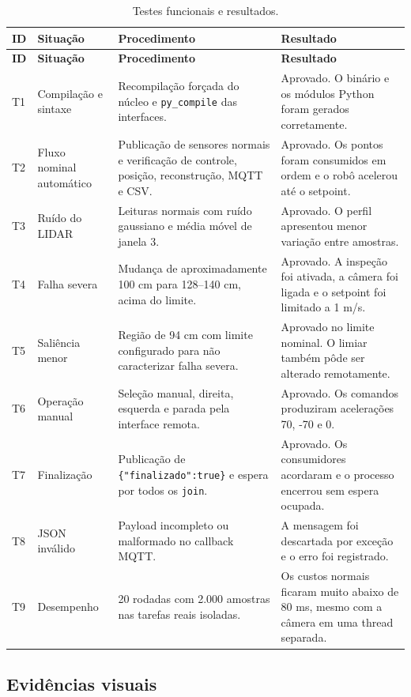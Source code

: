 \documentclass[12pt,a4paper]{article}
\begin{document}
\begin{longtable}{p{0.8cm}p{4.2cm}p{5.0cm}p{4.0cm}}
\caption{Testes funcionais e resultados.}
\label{tab:testes}\\
\toprule
\textbf{ID} & \textbf{Situação} & \textbf{Procedimento} & \textbf{Resultado} \\
\midrule
\endfirsthead
\toprule
\textbf{ID} & \textbf{Situação} & \textbf{Procedimento} & \textbf{Resultado} \\
\midrule
\endhead
T1 & Compilação e sintaxe & Recompilação forçada do núcleo e \texttt{py\_compile} das interfaces. & Aprovado. O binário e os módulos Python foram gerados corretamente. \\
T2 & Fluxo nominal automático & Publicação de sensores normais e verificação de controle, posição, reconstrução, MQTT e CSV. & Aprovado. Os pontos foram consumidos em ordem e o robô acelerou até o setpoint. \\
T3 & Ruído do LIDAR & Leituras normais com ruído gaussiano e média móvel de janela 3. & Aprovado. O perfil apresentou menor variação entre amostras. \\
T4 & Falha severa & Mudança de aproximadamente 100 cm para 128--140 cm, acima do limite. & Aprovado. A inspeção foi ativada, a câmera foi ligada e o setpoint foi limitado a 1 m/s. \\
T5 & Saliência menor & Região de 94 cm com limite configurado para não caracterizar falha severa. & Aprovado no limite nominal. O limiar também pôde ser alterado remotamente. \\
T6 & Operação manual & Seleção manual, direita, esquerda e parada pela interface remota. & Aprovado. Os comandos produziram acelerações 70, -70 e 0. \\
T7 & Finalização & Publicação de \texttt{\{"finalizado":true\}} e espera por todos os \texttt{join}. & Aprovado. Os consumidores acordaram e o processo encerrou sem espera ocupada. \\
T8 & JSON inválido & Payload incompleto ou malformado no callback MQTT. & A mensagem foi descartada por exceção e o erro foi registrado. \\
T9 & Desempenho & 20 rodadas com 2.000 amostras nas tarefas reais isoladas. & Os custos normais ficaram muito abaixo de 80 ms, mesmo com a câmera em uma thread separada. \\
\bottomrule
\end{longtable}

\subsection{Evidências visuais}
\end{document}
